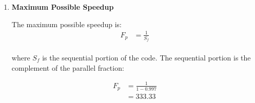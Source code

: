 \documentclass[11pt,letterpaper]{article}
\begin{document}
\begin{enumerate}
  \item \textbf{Maximum Possible Speedup}

    The maximum possible speedup is: 
    \begin{align*}
      F_p &= \frac{1}{S_f}\\
    \end{align*}

    where $S_f$ is the sequential portion of the code. The sequential portion
    is the complement of the parallel fraction: 

    \begin{align*}
      F_p &= \frac{1}{1 - 0.997}\\
      &= \mathbf{333.33}
    \end{align*}



\end{enumerate}
\end{document}
